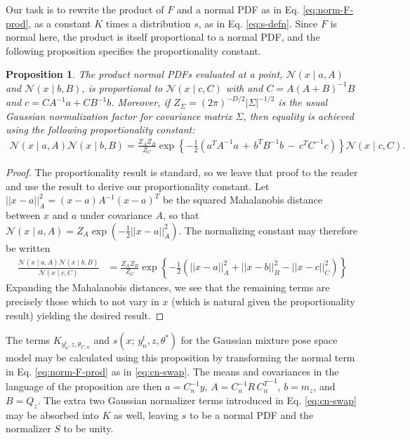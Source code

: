 \documentclass{article}         %
\newtheorem{proposition}{Proposition}[section]
\newcommand{\inv}{^{-1}}
\newcommand{\NN}{\mathcal{N}}
\newcommand{\abs}[1]{\left| #1 \right|}
\newcommand{\norm}[1]{\left|\left| #1 \right|\right|}
\newcommand{\cb}[1]{\left\{ #1 \right\}}
\newcommand{\pn}[1]{\left( #1 \right)}
\begin{document}
Our task is to rewrite the product of $F$ and a normal PDF as in Eq. \ref{eq:norm-F-prod}, as a constant $K$ times a distribution $s$, as in Eq. \ref{eq:s-defn}. Since $F$ is normal here, the product is itself proportional to a normal PDF, and the following proposition specifies the proportionality constant.
\begin{proposition}
    The product normal PDFs evaluated at a point, $\NN(x\mid a, A)$ and $\NN(x\mid b, B)$, is proportional to $ \NN(x\mid c, C)$ with and $C = A\pn{A + B}\inv B$ and $c = CA\inv a + CB\inv b$. Moreover, if $Z_\Sigma = \pn{2\pi}^{-D/2}\abs{\Sigma}^{-1/2}$ is the usual Gaussian normalization factor for covariance matrix $\Sigma$, then equality is achieved using the following proportionality constant:
    \begin{align}
        \NN(x\mid a, A) \NN(x\mid b, B) = \frac{Z_AZ_B}{Z_C} \exp\cb{-\frac{1}{2}\pn{a^TA\inv a \,+\, b^TB\inv b \,-\, c^T C\inv c}} \NN(x\mid c, C).
    \end{align}
\end{proposition}
\begin{proof}
The proportionality result is standard, so we leave that proof to the reader and use the result to derive our proportionality constant. Let $\norm{x-a}^2_A = (x - a)A\inv (x - a)^T$ be the squared Mahalanobis distance between $x$ and $a$ under covariance $A$, so that $\NN(x\mid a, A) = Z_{A}\exp(-\frac{1}{2}\norm{x-a}^2_A)$. The normalizing constant may therefore be written
\begin{align}
    \frac{\NN(x\mid a, A)\NN(x\mid b, B)}{\NN(x\mid c, C)} &= \frac{Z_AZ_B}{Z_C} \exp\cb{-\frac{1}{2}\pn{\norm{x - a}^2_A + \norm{x - b}^2_B - \norm{x - c}^2_C}}
\end{align}
Expanding the Mahalanobis distances, we see that the remaining terms are precisely those which to not vary in $x$ (which is natural given the proportionality result) yielding the desired result.
\end{proof}
The terms $K_{y^t_n, z, \theta_{C, n}}$ and $s(x;\, y^t_n, z, \theta^*)$ for the Gaussian mixture pose space model may be calculated using this proposition by transforming the normal term in Eq. \ref{eq:norm-F-prod} as in \ref{eq:cn-swap}. The means and covariances in the language of the proposition are then $a = C_n\inv y$, $A = C_n\inv R\, {C_n^T}\inv$, $b = m_z$, and $B = Q_z$. The extra two Gaussian normalizer terms introduced in Eq. \ref{eq:cn-swap} may be absorbed into $K$ as well, leaving $s$ to be a normal PDF and the normalizer $S$ to be unity. 
\end{document}
